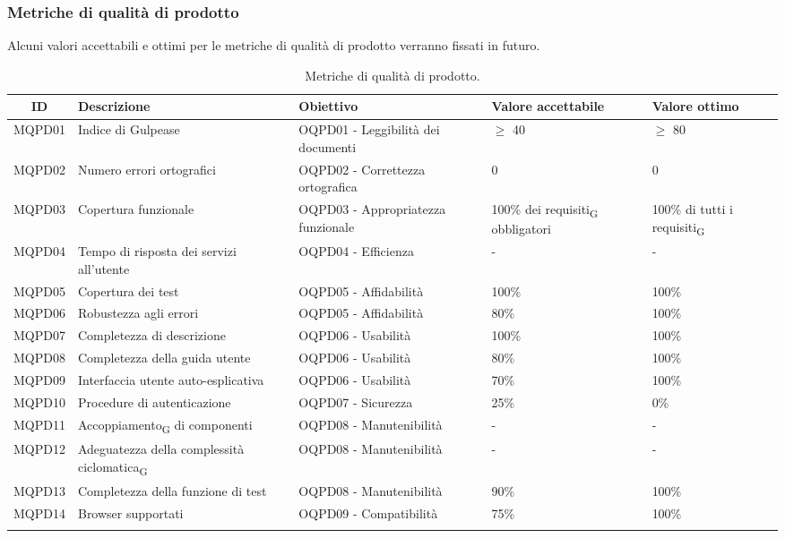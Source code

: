 \subsubsection{Metriche di qualità di prodotto}
Alcuni valori accettabili e ottimi per le metriche di qualità di prodotto verranno fissati in futuro.
\begin{table}[H]
	\centering
	\begin{tabularx}{\textwidth}{|c|X|X|X|X|}
		\hline
		\textbf{ID} & \textbf{Descrizione} & \textbf{Obiettivo} & \textbf{Valore accettabile} & \textbf{Valore ottimo}\\
		\hline
		MQPD01 & Indice di Gulpease & OQPD01 - Leggibilità dei documenti & $\geq$ 40 & $\geq$ 80 \\
		\hline
		MQPD02 & Numero errori ortografici & OQPD02 - Correttezza ortografica & 0 & 0 \\
		\hline
		MQPD03 & Copertura funzionale & OQPD03 - Appropriatezza funzionale & 100\% dei requisiti\textsubscript{G} obbligatori & 100\% di tutti i requisiti\textsubscript{G}\\
		\hline
		MQPD04 & Tempo di risposta dei servizi all'utente & OQPD04 - Efficienza & - & - \\
		\hline
		MQPD05 & Copertura dei test & OQPD05 - Affidabilità & 100\% & 100\% \\
		\hline
		MQPD06 & Robustezza agli errori & OQPD05 - Affidabilità & 80\% & 100\% \\
		\hline
		MQPD07 & Completezza di descrizione & OQPD06 - Usabilità & 100\% &  100\% \\
		\hline
		MQPD08 & Completezza della guida utente & OQPD06 - Usabilità & 80\% &  100\% \\
		\hline
		MQPD09 & Interfaccia utente auto-esplicativa & OQPD06 - Usabilità & 70\% &  100\% \\
		\hline
		MQPD10 & Procedure di autenticazione & OQPD07 - Sicurezza & 25\% &  0\% \\
		\hline
		MQPD11 & Accoppiamento\textsubscript{G} di componenti & OQPD08 - Manutenibilità & - & - \\
		\hline
		MQPD12 & Adeguatezza della complessità ciclomatica\textsubscript{G} & OQPD08 - Manutenibilità & - & - \\
		\hline
		MQPD13 & Completezza della funzione di test & OQPD08 - Manutenibilità & 90\% & 100\% \\
		\hline
		MQPD14 & Browser supportati & OQPD09 - Compatibilità & 75\% & 100\% \\
		\hline
		\caption{Metriche di qualità di prodotto.}
	\end{tabularx}
\end{table}
